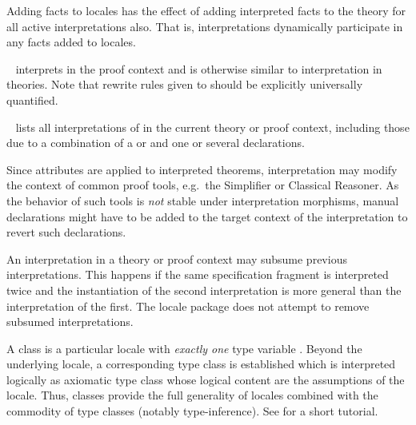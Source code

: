 \begin{isabellebody}
\begin{isamarkuptext}
\begin{description}
  Adding facts to locales has the effect of adding interpreted facts
  to the theory for all active interpretations also.  That is,
  interpretations dynamically participate in any facts added to
  locales.

  \item \hyperlink{command.interpret}{\mbox{}}~ interprets
   in the proof context and is otherwise similar to
  interpretation in theories.  Note that rewrite rules given to
  \hyperlink{command.interpret}{\mbox{}} should be explicitly universally quantified.

  \item \hyperlink{command.print-interps}{\mbox{}}~ lists all
  interpretations of  in the current theory or proof
  context, including those due to a combination of a \hyperlink{command.interpretation}{\mbox{}} or \hyperlink{command.interpret}{\mbox{}} and one or several
  \hyperlink{command.sublocale}{\mbox{}} declarations.

  \end{description}

  \begin{warn}
    Since attributes are applied to interpreted theorems,
    interpretation may modify the context of common proof tools, e.g.\
    the Simplifier or Classical Reasoner.  As the behavior of such
    tools is \emph{not} stable under interpretation morphisms, manual
    declarations might have to be added to the target context of the
    interpretation to revert such declarations.
  \end{warn}

  \begin{warn}
    An interpretation in a theory or proof context may subsume previous
    interpretations.  This happens if the same specification fragment
    is interpreted twice and the instantiation of the second
    interpretation is more general than the interpretation of the
    first.  The locale package does not attempt to remove subsumed
    interpretations.
  \end{warn}%
\end{isamarkuptext}%
\isamarkuptrue%
%
\isamarkuptrue%
%
\begin{isamarkuptext}%
A class is a particular locale with \emph{exactly one} type variable
  \isa{{\isasymalpha}}.  Beyond the underlying locale, a corresponding type class
  is established which is interpreted logically as axiomatic type
  class \cite{Wenzel:1997:TPHOL} whose logical content are the
  assumptions of the locale.  Thus, classes provide the full
  generality of locales combined with the commodity of type classes
  (notably type-inference).  See \cite{isabelle-classes} for a short
  tutorial.


\end{isamarkuptext}
\end{isabellebody}
